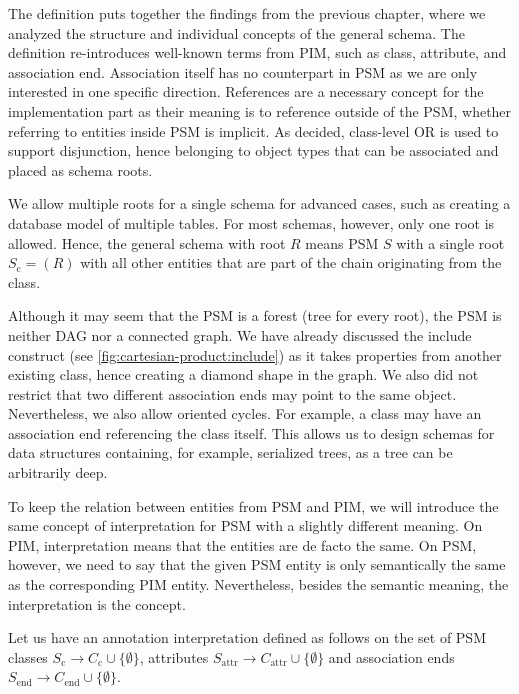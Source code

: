 The definition puts together the findings from the previous chapter, where we analyzed the structure and individual concepts of the general schema. The definition re-introduces well-known terms from PIM, such as class, attribute, and association end. Association itself has no counterpart in PSM as we are only interested in one specific direction. References are a necessary concept for the implementation part as their meaning is to reference outside of the PSM, whether referring to entities inside PSM is implicit. As decided, class-level OR is used to support disjunction, hence belonging to object types that can be associated and placed as schema roots.

We allow multiple roots for a single schema for advanced cases, such as creating a database model of multiple tables. For most schemas, however, only one root is allowed. Hence, the general schema with root $R$ means PSM $S$ with a single root $S_{\textrm{c}} = (R)$ with all other entities that are part of the chain originating from the class.

Although it may seem that the PSM is a forest (tree for every root), the PSM is neither DAG nor a connected graph. We have already discussed the include construct (see \autoref{fig:cartesian-product:include}) as it takes properties from another existing class, hence creating a diamond shape in the graph. We also did not restrict that two different association ends may point to the same object. Nevertheless, we also allow oriented cycles. For example, a class may have an association end referencing the class itself. This allows us to design schemas for data structures containing, for example, serialized trees, as a tree can be arbitrarily deep.

\medskip

To keep the relation between entities from PSM and PIM, we will introduce the same concept of interpretation for PSM with a slightly different meaning. On PIM, interpretation means that the entities are de facto the same. On PSM, however, we need to say that the given PSM entity is only semantically the same as the corresponding PIM entity. Nevertheless, besides the semantic meaning, the interpretation is the concept.

\begin{definition}
    Let us have an annotation $\textrm{interpretation}$ defined as follows on the set of PSM classes $S_{\textrm{c}}  \rightarrow C_{\textrm{c}} \cup \{\emptyset\}$, attributes $S_{\textrm{attr}}  \rightarrow C_{\textrm{attr}} \cup \{\emptyset\}$ and association ends $S_{\textrm{end}} \rightarrow C_{\textrm{end}} \cup \{\emptyset\}$.
\end{definition}

